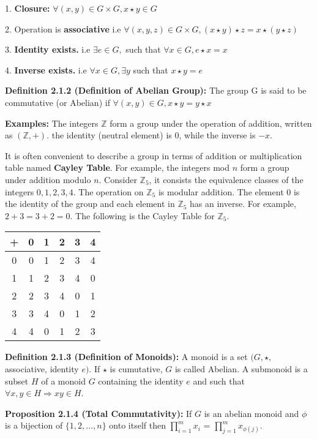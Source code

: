 \documentclass[12pt,openany]{book}
\theoremstyle{definition}
\theoremstyle{definition}
\begin{document}
1. \textbf{Closure:} $\forall (x,y) \in G \times G, x \star y \in G $

2. Operation is \textbf{associative} i.e $\forall (x, y, z) \in G \times G, (x \star y) \star z = x \star (y \star z) $

3. \textbf{Identity exists.} i.e $\exists e \in G,$ such that $\forall x \in G, e \star x = x $

4. \textbf{Inverse exists.} i.e $\forall x \in G, \exists y$ such that $x \star y = e$

\noindent\textbf{Definition 2.1.2 (Definition of Abelian Group):} The group G is said to be commutative (or Abelian) if $\forall (x,y) \in G, x \star y = y \star x$

\noindent\textbf{Examples:} The integers $\mathbb{Z}$ form a group under the operation of addition, written as $(\mathbb{Z}, +)$. the identity (neutral element) is $0$, while the inverse is $-x$.

\noindent It is often convenient to describe a group in terms of addition or multiplication table named \textbf{Cayley Table}. For example, the integers mod $n$ form a group under addition modulo $n$. Consider $\mathbb{Z}_5$, it consists the equivalence classes of the integers $0,1,2,3,4$. The operation on $\mathbb{Z}_5$ is modular addition. The element $0$ is the identity of the group and each element in $\mathbb{Z}_5$ has an inverse. For example, $2+3 = 3+2 = 0$. The following is the Cayley Table for $\mathbb{Z}_5$.

\begin{center}
\begin{tabular}{ |c|c|c|c|c|c| } 
\hline
+ & 0 & 1 & 2 & 3 & 4 \\
\hline
0 & 0 & 1 & 2 & 3 & 4 \\ 
1 & 1 & 2 & 3 & 4 & 0 \\ 
2 & 2 & 3 & 4 & 0 & 1 \\ 
3 & 3 & 4 & 0 & 1 & 2 \\ 
4 & 4 & 0 & 1 & 2 & 3 \\
\hline
\end{tabular}
\end{center}

\noindent\textbf{Definition 2.1.3 (Definition of Monoids):} A monoid is a set $(G, \star,$ associative, identity $e)$. If $\star$ is cumutative, $G$ is called Abelian. A submonoid is a subset $H$ of a monoid $G$ containing the identity $e$ and such that $\forall x, y \in H \Rightarrow xy \in H $.

\noindent\textbf{Proposition 2.1.4 (Total Commutativity):} If $G$ is an abelian monoid and $\phi$ is a bijection of $\{1,2,...,n\}$ onto itself then $\prod^{m}_{i=1}x_i$ = $\prod^{m}_{j=1}x_{\phi(j)}$.
\end{document}
